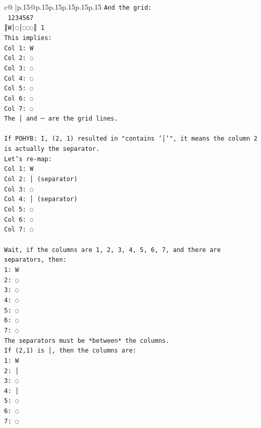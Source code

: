 \documentclass{article}
\begin{document}
{\begin{supertabular}{c@{$\;$}|p{.15\linewidth}@{}p{.15\linewidth}p{.15\linewidth}p{.15\linewidth}p{.15\linewidth}p{.15\linewidth}}
{{{\texttt{And the grid:} \\
\texttt{ 1234567} \\
\texttt{║W│◌│◌◌◌║ 1} \\
\texttt{This implies:} \\
\texttt{Col 1: W} \\
\texttt{Col 2: ◌} \\
\texttt{Col 3: ◌} \\
\texttt{Col 4: ◌} \\
\texttt{Col 5: ◌} \\
\texttt{Col 6: ◌} \\
\texttt{Col 7: ◌} \\
\texttt{The │ and ─ are the grid lines.} \\
\\ 
\texttt{If POHYB: I, (2, 1) resulted in "contains '│'", it means the column 2 is actually the separator.} \\
\texttt{Let's re{-}map:} \\
\texttt{Col 1: W} \\
\texttt{Col 2: │ (separator)} \\
\texttt{Col 3: ◌} \\
\texttt{Col 4: │ (separator)} \\
\texttt{Col 5: ◌} \\
\texttt{Col 6: ◌} \\
\texttt{Col 7: ◌} \\
\\ 
\texttt{Wait, if the columns are 1, 2, 3, 4, 5, 6, 7, and there are separators, then:} \\
\texttt{1: W} \\
\texttt{2: ◌} \\
\texttt{3: ◌} \\
\texttt{4: ◌} \\
\texttt{5: ◌} \\
\texttt{6: ◌} \\
\texttt{7: ◌} \\
\texttt{The separators must be *between* the columns.} \\
\texttt{If (2,1) is │, then the columns are:} \\
\texttt{1: W} \\
\texttt{2: │} \\
\texttt{3: ◌} \\
\texttt{4: │} \\
\texttt{5: ◌} \\
\texttt{6: ◌} \\
\texttt{7: ◌} \\
}}}
\end{supertabular}}
\end{document}
